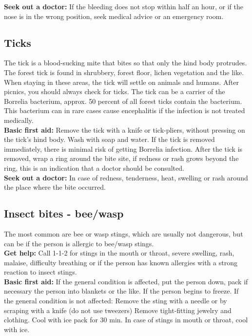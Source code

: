 \documentclass[../../../main.tex]{subfiles}
\begin{document}
\begin{multicols}{2}
\textbf{Seek out a doctor:} If the bleeding does not stop within half an hour, or if the nose is in the wrong position, seek medical advice or an emergency room.
\\
\subsection*{Ticks} The tick is a blood-sucking mite that bites so that only the hind body protrudes. The forest tick is found in shrubbery, forest floor, lichen
vegetation and the like. When staying in these areas, the tick will settle on animals and humans. After picnics, you should always check for ticks. The tick can be a carrier of the Borrelia bacterium, approx. 50 percent of all forest ticks contain the bacterium. This bacterium can in rare cases cause encephalitis if the infection is not treated medically.
\\

\textbf{Basic first aid:} Remove the tick with a knife or tick-pliers, without pressing on the tick's hind body. Wash with soap and water. If the tick is removed immediately, there is minimal risk of getting Borrelia infection. After the tick is removed, wrap a ring around the bite site, if redness or rash grows beyond the ring, this is an indication that a doctor should be consulted.
\\

\textbf{Seek out a doctor:} In case of redness, tenderness, heat, swelling or rash around the place where the bite occurred.
\\

\subsection*{Insect bites - bee/wasp} The most common are bee or wasp stings, which are usually not dangerous, but can be if the person is allergic to bee/wasp stings.
\\

\textbf{Get help:} Call 1-1-2 for stings in the mouth or throat, severe swelling, rash, malaise, difficulty breathing or if the person has known allergies with a strong reaction to insect stings.
\\

\textbf{Basic first aid:} If the general condition is affected, put the person down, pack if necessary the person into blankets or the like. If the person begins to freeze. If the general condition is not affected: Remove the sting with a needle or by scraping with a knife (do not use tweezers) Remove tight-fitting jewelry and clothing. Cool with ice pack for 30 min. In case of stings in mouth or throat, cool with ice.
\\


\end{multicols}
\end{document}
